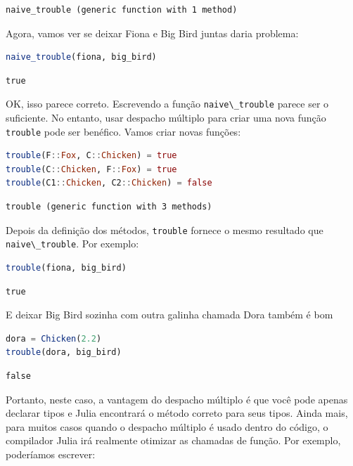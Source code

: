 \documentclass[
  notoc %
]{tufte-book}
\newcommand{\passthrough}[1]{#1}
\begin{document}
\begin{lstlisting}[language=Output]
naive_trouble (generic function with 1 method)
\end{lstlisting}

Agora, vamos ver se deixar Fiona e Big Bird juntas daria problema:

\begin{lstlisting}[language=Julia]
naive_trouble(fiona, big_bird)
\end{lstlisting}

\begin{lstlisting}[language=Output]
true
\end{lstlisting}

OK, isso parece correto. Escrevendo a função
\passthrough{\lstinline!naive\_trouble!} parece ser o suficiente. No
entanto, usar despacho múltiplo para criar uma nova função
\passthrough{\lstinline!trouble!} pode ser benéfico. Vamos criar novas
funções:

\begin{lstlisting}[language=Julia]
trouble(F::Fox, C::Chicken) = true
trouble(C::Chicken, F::Fox) = true
trouble(C1::Chicken, C2::Chicken) = false
\end{lstlisting}

\begin{lstlisting}[language=Output]
trouble (generic function with 3 methods)
\end{lstlisting}

Depois da definição dos métodos, \passthrough{\lstinline!trouble!}
fornece o mesmo resultado que \passthrough{\lstinline!naive\_trouble!}.
Por exemplo:

\begin{lstlisting}[language=Julia]
trouble(fiona, big_bird)
\end{lstlisting}

\begin{lstlisting}[language=Output]
true
\end{lstlisting}

E deixar Big Bird sozinha com outra galinha chamada Dora também é bom

\begin{lstlisting}[language=Julia]
dora = Chicken(2.2)
trouble(dora, big_bird)
\end{lstlisting}

\begin{lstlisting}[language=Output]
false
\end{lstlisting}

Portanto, neste caso, a vantagem do despacho múltiplo é que você pode
apenas declarar tipos e Julia encontrará o método correto para seus
tipos. Ainda mais, para muitos casos quando o despacho múltiplo é usado
dentro do código, o compilador Julia irá realmente otimizar as chamadas
de função. Por exemplo, poderíamos escrever:
\end{document}
